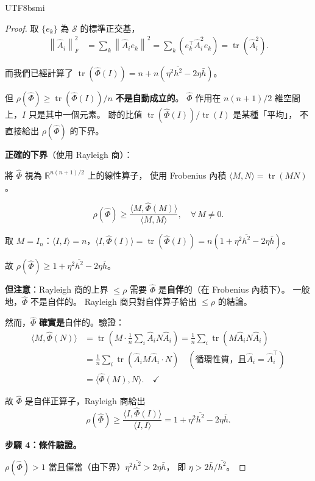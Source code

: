 \documentclass[11pt,a4paper]{article}
\theoremstyle{definition}
\DeclareMathOperator{\tr}{tr}
\newcommand{\R}{\mathbb{R}}
\newcommand{\cS}{\mathcal{S}}
\newcommand{\norm}[1]{\left\|#1\right\|}
\begin{document}
\begin{CJK}{UTF8}{bsmi}
\begin{proof}
  取 $\{e_k\}$ 為 $\cS$ 的標準正交基，
  \begin{align*}
    \norm{\hat{A}_i}_F^2
    &= \sum_k \norm{\hat{A}_i e_k}^2
    = \sum_k (e_k^\top\hat{A}_i^2 e_k) = \tr(\hat{A}_i^2).
  \end{align*}

  而我們已經計算了 $\tr(\hat\Phi(I)) = n + n(\eta^2\overline{h^2} - 2\eta\bar{h})$。

  但 $\rho(\hat\Phi) \geq \tr(\hat\Phi(I))/n$ \textbf{不是自動成立的}。
  $\hat\Phi$ 作用在 $n(n+1)/2$ 維空間上，$I$ 只是其中一個元素。
  跡的比值 $\tr(\hat\Phi(I))/\tr(I)$ 是某種「平均」，
  不直接給出 $\rho(\hat\Phi)$ 的下界。

  \medskip
  \textbf{正確的下界}（使用 Rayleigh 商）：

  將 $\hat\Phi$ 視為 $\R^{n(n+1)/2}$ 上的線性算子，
  使用 Frobenius 內積 $\langle M, N\rangle = \tr(MN)$。

  \[
    \rho(\hat\Phi) \geq \frac{\langle M, \hat\Phi(M)\rangle}{\langle M, M\rangle},
    \quad \forall\, M \neq 0.
  \]

  取 $M = I_n$：$\langle I, I\rangle = n$，$\langle I, \hat\Phi(I)\rangle = \tr(\hat\Phi(I)) = n(1 + \eta^2\overline{h^2} - 2\eta\bar{h})$。

  故 $\rho(\hat\Phi) \geq 1 + \eta^2\overline{h^2} - 2\eta\bar{h}$。

  \textbf{但注意}：Rayleigh 商的上界 $\leq \rho$
  需要 $\hat\Phi$ 是\textbf{自伴}的（在 Frobenius 內積下）。
  一般地，$\hat\Phi$ 不是自伴的。
  Rayleigh 商只對自伴算子給出 $\leq \rho$ 的結論。

  然而，$\hat\Phi$ \textbf{確實是}自伴的。驗證：
  \begin{align*}
    \langle M, \hat\Phi(N)\rangle
    &= \tr\left(M \cdot \frac{1}{n}\sum_i\hat{A}_i N\hat{A}_i\right)
    = \frac{1}{n}\sum_i\tr(M\hat{A}_i N\hat{A}_i)\\
    &= \frac{1}{n}\sum_i\tr(\hat{A}_i M\hat{A}_i\cdot N)
    \quad(\text{循環性質，且}\hat{A}_i = \hat{A}_i^\top)\\
    &= \langle \hat\Phi(M), N\rangle. \quad\checkmark
  \end{align*}

  故 $\hat\Phi$ 是自伴正算子，Rayleigh 商給出
  \[
    \rho(\hat\Phi) \geq \frac{\langle I, \hat\Phi(I)\rangle}{\langle I, I\rangle}
    = 1 + \eta^2\overline{h^2} - 2\eta\bar{h}.
  \]

  \textbf{步驟 4：條件驗證。}

  $\rho(\hat\Phi) > 1$ 當且僅當（由下界）$\eta^2\overline{h^2} > 2\eta\bar{h}$，
  即 $\eta > 2\bar{h}/\overline{h^2}$。


\end{proof}
\end{CJK}
\end{document}
